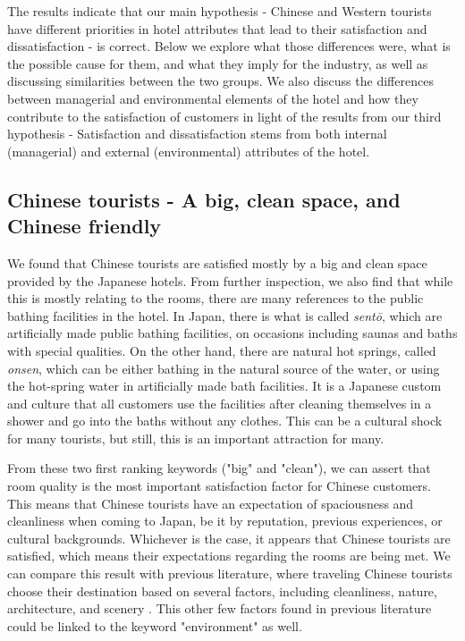 The results indicate that our main hypothesis - Chinese and Western tourists have different priorities in hotel attributes that lead to their satisfaction and dissatisfaction - is correct. Below we explore what those differences were, what is the possible cause for them, and what they imply for the industry, as well as discussing similarities between the two groups. We also discuss the differences between managerial and environmental elements of the hotel and how they contribute to the satisfaction of customers in light of the results from our third hypothesis - Satisfaction and dissatisfaction stems from both internal (managerial) and external (environmental) attributes of the hotel.

\subsection{Chinese tourists - A big, clean space, and Chinese friendly}\label{disc:zh}

We found that Chinese tourists are satisfied mostly by a big and clean space provided by the Japanese hotels. From further inspection, we also find that while this is mostly relating to the rooms, there are many references to the public bathing facilities in the hotel. In Japan, there is what is called \textit{sent\=o}, which are artificially made public bathing facilities, on occasions including saunas and baths with special qualities. On the other hand, there are natural hot springs, called \textit{onsen}, which can be either bathing in the natural source of the water, or using the hot-spring water in artificially made bath facilities. It is a Japanese custom and culture that all customers use the facilities after cleaning themselves in a shower and go into the baths without any clothes. This can be a cultural shock for many tourists, but still, this is an important attraction for many.

From these two first ranking keywords ("big" and "clean"), we can assert that room quality is the most important satisfaction factor for Chinese customers. This means that Chinese tourists have an expectation of spaciousness and cleanliness when coming to Japan, be it by reputation, previous experiences, or cultural backgrounds. Whichever is the case, it appears that Chinese tourists are satisfied, which means their expectations regarding the rooms are being met. We can compare this result with previous literature, where traveling Chinese tourists choose their destination based on several factors, including cleanliness, nature, architecture, and scenery \cite[][]{ryan2001}. This other few factors found in previous literature could be linked to the keyword "environment" as well.

